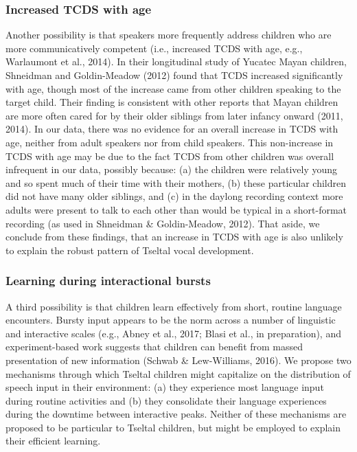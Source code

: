 \documentclass[floatsintext,man]{apa6}
\theoremstyle{definition}
\theoremstyle{definition}
\theoremstyle{definition}
\theoremstyle{remark}
\begin{document}
\subsubsection{Increased TCDS with age}\label{increased-tcds-with-age}

Another possibility is that speakers more frequently address children
who are more communicatively competent (i.e., increased TCDS with age,
e.g., Warlaumont et al., 2014). In their longitudinal study of Yucatec
Mayan children, Shneidman and Goldin-Meadow (2012) found that TCDS
increased significantly with age, though most of the increase came from
other children speaking to the target child. Their finding is consistent
with other reports that Mayan children are more often cared for by their
older siblings from later infancy onward (2011, 2014). In our data,
there was no evidence for an overall increase in TCDS with age, neither
from adult speakers nor from child speakers. This non-increase in TCDS
with age may be due to the fact TCDS from other children was overall
infrequent in our data, possibly because: (a) the children were
relatively young and so spent much of their time with their mothers, (b)
these particular children did not have many older siblings, and (c) in
the daylong recording context more adults were present to talk to each
other than would be typical in a short-format recording (as used in
Shneidman \& Goldin-Meadow, 2012). That aside, we conclude from these
findings, that an increase in TCDS with age is also unlikely to explain
the robust pattern of Tseltal vocal development.

\subsubsection{Learning during interactional
bursts}\label{learning-during-interactional-bursts}

A third possibility is that children learn effectively from short,
routine language encounters. Bursty input appears to be the norm across
a number of linguistic and interactive scales (e.g., Abney et al., 2017;
Blasi et al., in preparation), and experiment-based work suggests that
children can benefit from massed presentation of new information (Schwab
\& Lew-Williams, 2016). We propose two mechanisms through which Tseltal
children might capitalize on the distribution of speech input in their
environment: (a) they experience most language input during routine
activities and (b) they consolidate their language experiences during
the downtime between interactive peaks. Neither of these mechanisms are
proposed to be particular to Tseltal children, but might be employed to
explain their efficient learning.
\end{document}
